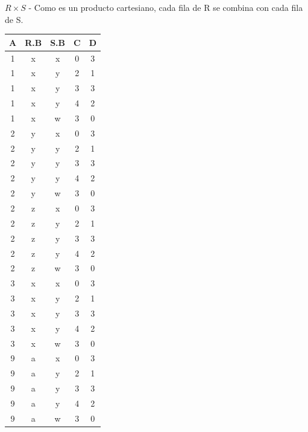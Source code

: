 \item $R \times S$ - Como es un producto cartesiano, cada fila de R se combina con cada fila de S.

\begin{center}
\begin{tabular}{ccccc}
\toprule
\textbf{A} & \textbf{R.B} & \textbf{S.B} & \textbf{C} & \textbf{D} \\
\midrule
1 & x & x & 0 & 3 \\
1 & x & y & 2 & 1 \\
1 & x & y & 3 & 3 \\
1 & x & y & 4 & 2 \\
1 & x & w & 3 & 0 \\
2 & y & x & 0 & 3 \\
2 & y & y & 2 & 1 \\
2 & y & y & 3 & 3 \\
2 & y & y & 4 & 2 \\
2 & y & w & 3 & 0 \\
2 & z & x & 0 & 3 \\
2 & z & y & 2 & 1 \\
2 & z & y & 3 & 3 \\
2 & z & y & 4 & 2 \\
2 & z & w & 3 & 0 \\
3 & x & x & 0 & 3 \\
3 & x & y & 2 & 1 \\
3 & x & y & 3 & 3 \\
3 & x & y & 4 & 2 \\
3 & x & w & 3 & 0 \\
9 & a & x & 0 & 3 \\
9 & a & y & 2 & 1 \\
9 & a & y & 3 & 3 \\
9 & a & y & 4 & 2 \\
9 & a & w & 3 & 0 \\
\bottomrule
\end{tabular}
\end{center}

